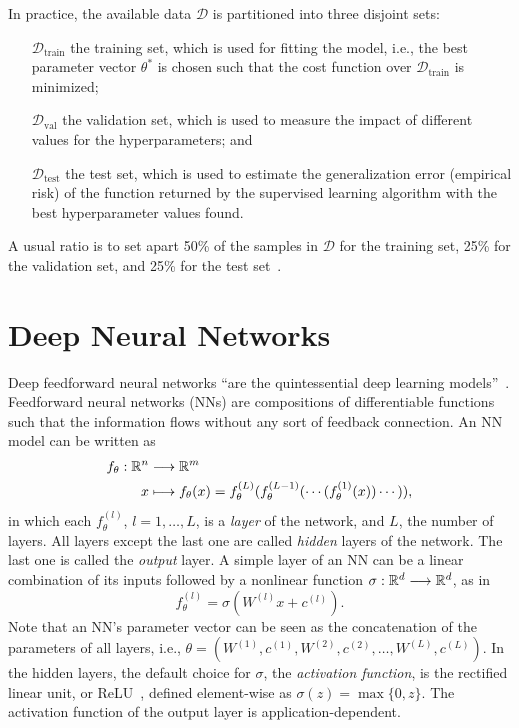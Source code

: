 In practice, the available data $\mathcal{D}$ is partitioned into three disjoint sets:
\begin{itemize}
    \item[$\mathcal{D}_\textrm{train}$] the training set, which is used for fitting the model, i.e., the best parameter vector $\theta^*$ is chosen such that the cost function over $\mathcal{D}_\textrm{train}$ is minimized;
    
    \item[$\mathcal{D}_\textrm{val}$] the validation set, which is used to measure the impact of different values for the hyperparameters; and
    
    \item[$\mathcal{D}_\textrm{test}$] the test set, which is used to estimate the generalization error (empirical risk) of the function returned by the supervised learning algorithm with the best hyperparameter values found.
\end{itemize}
A usual ratio is to set apart 50\% of the samples in $\mathcal{D}$ for the training set, 25\% for the validation set, and 25\% for the test set~\cite{hastieElementsStatisticalLearning2009}.


\section{Deep Neural Networks}

Deep feedforward neural networks ``are the quintessential deep learning models''~\cite{Goodfellow-et-al-2016}.
Feedforward neural networks (NNs) are compositions of differentiable functions such that the information flows without any sort of feedback connection.
An NN model can be written as
\begin{align*}
    f_\theta: \mathbb{R}^{n} &\longrightarrow \mathbb{R}^{m} \\
    x &\longmapsto f_\theta(x) = f^{(L)}_\theta(f^{(L-1)}_\theta(\cdots(f^{(1)}_\theta(x))\cdots))
,\end{align*}
in which each $f^{(l)}_\theta$, $l=1,\ldots,L$, is a \emph{layer} of the network, and $L$, the number of layers.
All layers except the last one are called \emph{hidden} layers of the network.
The last one is called the \emph{output} layer.
A simple layer of an NN can be a linear combination of its inputs followed by a nonlinear function $\sigma : \mathbb{R}^{d} \longrightarrow \mathbb{R}^{d}$, as in \[
f^{(l)}_\theta = \sigma\left( W^{(l)} x + c^{(l)} \right) 
.\] 
Note that an NN's parameter vector can be seen as the concatenation of the parameters of all layers, i.e., $\theta = (W^{(1)},c^{(1)},W^{(2)},c^{(2)},\ldots,W^{(L)},c^{(L)})$.
In the hidden layers, the default choice for $\sigma$, the \emph{activation function}, is the rectified linear unit, or ReLU~\cite{Goodfellow-et-al-2016}, defined element-wise as $\sigma(z)=\max\{0,z\}$.
The activation function of the output layer is application-dependent.

